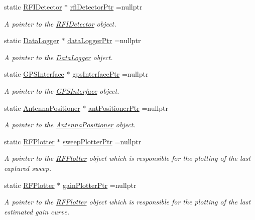 \begin{DoxyCompactItemize}
static \hyperlink{classRFIDetector}{R\+F\+I\+Detector} $\ast$ \hyperlink{classSignalHandler_a9ce3533694e1e412496dc5a9b339ccc3}{rfi\+Detector\+Ptr} =nullptr
\begin{DoxyCompactList}\small\item\em A pointer to the {\itshape \hyperlink{classRFIDetector}{R\+F\+I\+Detector}} object. \end{DoxyCompactList}\item 
static \hyperlink{classDataLogger}{Data\+Logger} $\ast$ \hyperlink{classSignalHandler_a114e600bdc2ad95efbc2991c97f3732c}{data\+Logger\+Ptr} =nullptr
\begin{DoxyCompactList}\small\item\em A pointer to the {\itshape \hyperlink{classDataLogger}{Data\+Logger}} object. \end{DoxyCompactList}\item 
static \hyperlink{classGPSInterface}{G\+P\+S\+Interface} $\ast$ \hyperlink{classSignalHandler_ac6bc3decceefdff9d3e5c15e4125fe08}{gps\+Interface\+Ptr} =nullptr
\begin{DoxyCompactList}\small\item\em A pointer to the {\itshape \hyperlink{classGPSInterface}{G\+P\+S\+Interface}} object. \end{DoxyCompactList}\item 
static \hyperlink{classAntennaPositioner}{Antenna\+Positioner} $\ast$ \hyperlink{classSignalHandler_a04f82481d0f5795308e6e2cef7bb0f88}{ant\+Positioner\+Ptr} =nullptr
\begin{DoxyCompactList}\small\item\em A pointer to the {\itshape \hyperlink{classAntennaPositioner}{Antenna\+Positioner}} object. \end{DoxyCompactList}\item 
static \hyperlink{classRFPlotter}{R\+F\+Plotter} $\ast$ \hyperlink{classSignalHandler_a7ec978dc8c16c31aa8faefe4e350302c}{sweep\+Plotter\+Ptr} =nullptr
\begin{DoxyCompactList}\small\item\em A pointer to the {\itshape \hyperlink{classRFPlotter}{R\+F\+Plotter}} object which is responsible for the plotting of the last captured sweep. \end{DoxyCompactList}\item 
static \hyperlink{classRFPlotter}{R\+F\+Plotter} $\ast$ \hyperlink{classSignalHandler_a040fa3711d4239933dd28a00b24965b2}{gain\+Plotter\+Ptr} =nullptr
\begin{DoxyCompactList}\small\item\em A pointer to the {\itshape \hyperlink{classRFPlotter}{R\+F\+Plotter}} object which is responsible for the plotting of the last estimated gain curve. \end{DoxyCompactList}\item 

\end{DoxyCompactItemize}
